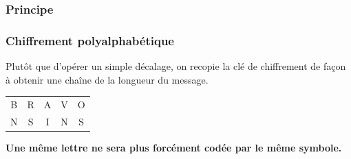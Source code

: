 \documentclass[svgnames,11pt]{beamer}
\begin{document}
\subsubsection{Principe}
\begin{frame}
    \frametitle{Chiffrement polyalphabétique}

    Plutôt que d'opérer un simple décalage, on recopie la clé de chiffrement de façon à obtenir une chaîne de la longueur du message.
\begin{center}
    \begin{tabular}{*{5}{c}}
        B&R&A&V&O\\
        N&S&I&N&S\\
    \end{tabular}
\end{center}
\begin{center}
\textbf{Une même lettre ne sera plus forcément codée par le même symbole.}
\end{center}
\end{frame}
\end{document}
